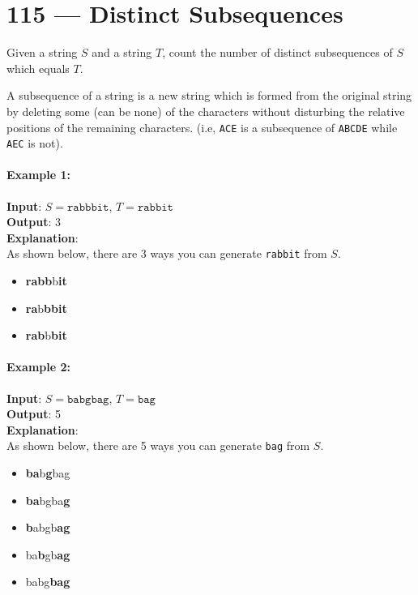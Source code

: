 \section{115 --- Distinct Subsequences}
Given a string $S$ and a string $T$, count the number of distinct subsequences of $S$ which equals $T$.
\par
A subsequence of a string is a new string which is formed from the original string by deleting some (can be none) of the characters without disturbing the relative positions of the remaining characters. (i.e, \texttt{ACE} is a subsequence of \texttt{ABCDE} while \texttt{AEC} is not).
\paragraph{Example 1:}
\begin{flushleft}
\textbf{Input}: $S = \texttt{rabbbit}$, $T = \texttt{rabbit}$
\\
\textbf{Output}: 3
\\
\textbf{Explanation}:
\\
As shown below, there are 3 ways you can generate \texttt{rabbit} from $S$.
\begin{itemize}
    \item \textbf{rabb}b\textbf{it}
    \item \textbf{ra}b\textbf{bbit}
    \item \textbf{rab}b\textbf{bit}
\end{itemize}
\end{flushleft}
\paragraph{Example 2:}
\begin{flushleft}
\textbf{Input}: $S = \texttt{babgbag}$,  $T = \texttt{bag}$
\\
\textbf{Output}: 5
\\
\textbf{Explanation}:
\\
As shown below, there are 5 ways you can generate \texttt{bag} from $S$.
\begin{itemize}
    \item \textbf{ba}b\textbf{g}bag
    \item \textbf{ba}bgba\textbf{g}
    \item \textbf{b}abgb\textbf{ag}
    \item ba\textbf{b}gb\textbf{ag}
    \item babg\textbf{bag}
    \end{itemize}
\end{flushleft}
